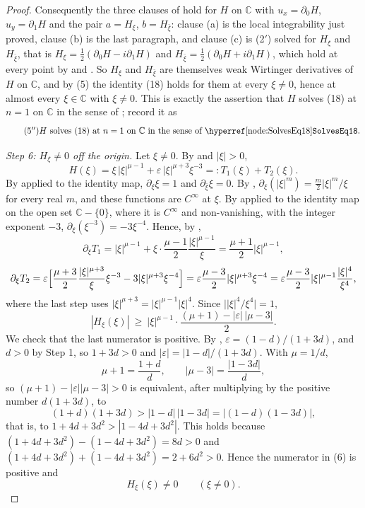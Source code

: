 \begin{proof}
Consequently the three clauses of  hold for $H$ on
$\mathbb{C}$ with $u_x=\partial_0H$, $u_y=\partial_1H$ and the pair
$a=H_\xi$, $b=H_{\bar\xi}$: clause (a) is the local integrability just proved,
clause (b) is the last paragraph, and clause (c) is (2$'$) solved for $H_\xi$
and $H_{\bar\xi}$, that is
$H_\xi=\tfrac12(\partial_0H-i\partial_1H)$ and
$H_{\bar\xi}=\tfrac12(\partial_0H+i\partial_1H)$, which hold at every point by
 and .  So $H_\xi$ and $H_{\bar\xi}$ are themselves
weak Wirtinger derivatives of $H$ on $\mathbb{C}$, and by (5) the identity
(18) holds for them at every $\xi\neq0$, hence at almost every
$\xi\in\mathbb{C}$ with $\xi\neq0$.  This is exactly the assertion that $H$
solves (18) at $n=1$ on $\mathbb{C}$ in the sense of ;
record it as
\begin{equation}\tag{5$''$}
  H\ \text{solves (18) at }n=1\ \text{on }\mathbb{C}\ \text{in the sense of
  \noderef{SolvesEq18}} .
\end{equation}

\emph{Step 6: $H_\xi\neq0$ off the origin.}  Let $\xi\neq0$.  By
 and $|\xi|>0$,
\[
  H(\xi)=\xi\,|\xi|^{\mu-1}+\varepsilon\,|\xi|^{\mu+3}\xi^{-3}
  =:T_1(\xi)+T_2(\xi).
\]
By  applied to the identity map, $\partial_\xi\xi=1$ and
$\partial_{\bar\xi}\xi=0$.  By ,
$\partial_\xi(|\xi|^{m})=\tfrac m2|\xi|^{m}/\xi$ for every real $m$, and these
functions are $C^\infty$ at $\xi$.  By  applied to
the identity map on the open set $\mathbb{C}-\{0\}$, where it is $C^\infty$ and
non-vanishing, with the integer exponent $-3$,
$\partial_\xi(\xi^{-3})=-3\xi^{-4}$.  Hence, by
,
\[
  \partial_\xi T_1=|\xi|^{\mu-1}+\xi\cdot\frac{\mu-1}{2}
    \frac{|\xi|^{\mu-1}}{\xi}=\frac{\mu+1}{2}|\xi|^{\mu-1},
\]
\[
  \partial_\xi T_2
  =\varepsilon\Bigl[\frac{\mu+3}{2}\frac{|\xi|^{\mu+3}}{\xi}\xi^{-3}
    -3|\xi|^{\mu+3}\xi^{-4}\Bigr]
  =\varepsilon\frac{\mu-3}{2}|\xi|^{\mu+3}\xi^{-4}
  =\varepsilon\frac{\mu-3}{2}|\xi|^{\mu-1}\frac{|\xi|^{4}}{\xi^{4}} ,
\]
where the last step uses $|\xi|^{\mu+3}=|\xi|^{\mu-1}|\xi|^{4}$.  Since
$\bigl||\xi|^{4}/\xi^{4}\bigr|=1$,
\begin{equation}\tag{6}
  |H_\xi(\xi)|\ \ge\ |\xi|^{\mu-1}\cdot
    \frac{(\mu+1)-|\varepsilon|\,|\mu-3|}{2} .
\end{equation}
We check that the last numerator is positive.  By
, $\varepsilon=(1-d)/(1+3d)$, and $d>0$ by Step 1, so
$1+3d>0$ and $|\varepsilon|=|1-d|/(1+3d)$.  With $\mu=1/d$,
\[
  \mu+1=\frac{1+d}{d},\qquad |\mu-3|=\frac{|1-3d|}{d},
\]
so $(\mu+1)-|\varepsilon||\mu-3|>0$ is equivalent, after multiplying by the
positive number $d(1+3d)$, to
\[
  (1+d)(1+3d)>|1-d|\,|1-3d|=|(1-d)(1-3d)| ,
\]
that is, to $1+4d+3d^{2}>|1-4d+3d^{2}|$.  This holds because
$(1+4d+3d^{2})-(1-4d+3d^{2})=8d>0$ and
$(1+4d+3d^{2})+(1-4d+3d^{2})=2+6d^{2}>0$.  Hence the numerator in (6) is
positive and
\begin{equation}\tag{7}
  H_\xi(\xi)\neq0\qquad(\xi\neq0).
\end{equation}


\end{proof}
